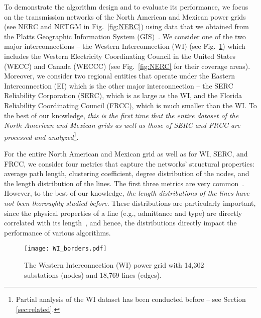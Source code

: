 \documentclass[10pt,journal]{IEEEtran}
\begin{document}
To demonstrate the algorithm design and to evaluate its performance, we focus on the transmission networks of the North American and Mexican power grids (see NERC and NETGM in Fig.~\ref{fig:NERC}) using data that we obtained from the Platts Geographic Information System (GIS)~\cite{GIS}. We consider one of the two major interconnections -- the Western Interconnection (WI) (see Fig.~\ref{fig:WI}) which includes the Western Electricity Coordinating Council in the United States (WECC) and Canada (WECCC) (see Fig.~\ref{fig:NERC} for their coverage areas). Moreover, we consider two regional entities that operate under the Eastern Interconnection (EI) which is the other major interconnection -- the SERC Reliability Corporation (SERC), which is as large as the WI, and the Florida Reliability Coordinating Council (FRCC), which is much smaller than the WI.
To the best of our knowledge, \emph{this is the first time that the entire dataset of the North American and Mexican grids as well as those of SERC and FRCC are processed and analyzed}\footnote{Partial analysis of the WI dataset has been conducted before -- see Section \ref{sec:related}.}.

For the entire North American and Mexican grid as well as for WI, SERC, and FRCC, we consider four metrics that capture the networks' structural properties: average path length, clustering coefficient, degree distribution of the nodes, and the length distribution of the lines. The first three metrics are very common~\cite{watts1998collective,barabasi1999emergence,amaral2000classes,albert2004structural,crucitti2004topological,chassin2005evaluating,cotilla2012comparing}. However, to the best of our knowledge, \emph{the length distributions of the lines have not been thoroughly studied before}. These distributions are particularly important,
since the physical properties of a line (e.g., admittance and type) are directly correlated with its length~\cite{glover2011power}, and hence, the distributions directly impact the performance of various algorithms.



\begin{figure}[t]
\centering
\vspace*{-0.2cm}
\texttt{[image: WI\_borders.pdf]}
\vspace*{-0.2cm}
\caption{The Western Interconnection (WI) power grid with 14,302 substations (nodes) and 18,769 lines (edges).}
\label{fig:WI}
\vspace*{0.2cm}
\end{figure}
\end{document}
